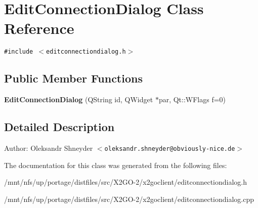 \section{Edit\-Connection\-Dialog Class Reference}
\label{classEditConnectionDialog}
{\tt \#include $<$editconnectiondialog.h$>$}

\subsection*{Public Member Functions}
\begin{CompactItemize}
\item 
\textbf{Edit\-Connection\-Dialog} (QString id, QWidget $\ast$par, Qt::WFlags f=0)\label{classEditConnectionDialog_4fcb4e47405b6ecd008f8977b297b5d7}

\end{CompactItemize}


\subsection{Detailed Description}
\begin{Desc}
\item[Author:]Oleksandr Shneyder $<$\tt{oleksandr.shneyder@obviously-nice.de}$>$ \end{Desc}




The documentation for this class was generated from the following files:\begin{CompactItemize}
\item 
/mnt/nfs/up/portage/distfiles/src/X2GO-2/x2goclient/editconnectiondialog.h\item 
/mnt/nfs/up/portage/distfiles/src/X2GO-2/x2goclient/editconnectiondialog.cpp\end{CompactItemize}
